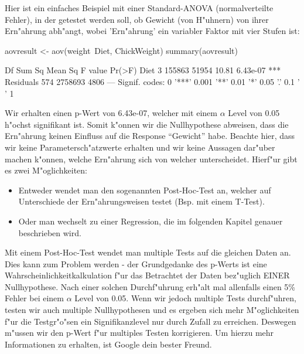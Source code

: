 \documentclass[a4paper,twoside]{tufte-book}\usepackage[]{graphicx}\usepackage[]{color}
\begin{document}
Hier ist ein einfaches Beispiel mit einer Standard-ANOVA (normalverteilte Fehler), in der getestet werden soll, ob Gewicht (von H"uhnern) von ihrer Ern"ahrung abh"angt, wobei 'Ern"ahrung' ein variabler Faktor mit vier Stufen ist:

\begin{Schunk}
\begin{Sinput}
aovresult <- aov(weight~Diet, ChickWeight)
summary(aovresult)
\end{Sinput}
\begin{Soutput}
             Df  Sum Sq Mean Sq F value   Pr(>F)    
Diet          3  155863   51954   10.81 6.43e-07 ***
Residuals   574 2758693    4806                     
---
Signif. codes:  0 '***' 0.001 '**' 0.01 '*' 0.05 '.' 0.1 ' ' 1
\end{Soutput}
\end{Schunk}

Wir erhalten einen p-Wert von 6.43e-07, welcher mit einem $\alpha$ Level von 0.05 h"ochst signifikant ist. Somit k"onnen wir die Nullhypothese abweisen, dass die Ern"ahrung keinen Einfluss auf die Response "`Gewicht"' habe. Beachte hier, dass wir keine Parametersch"atzwerte erhalten und wir keine Aussagen dar"uber machen k"onnen, welche Ern"ahrung sich von welcher unterscheidet. Hierf"ur gibt es zwei M"oglichkeiten:

\begin{itemize}
\item Entweder wendet man den sogenannten Post-Hoc-Test an, welcher auf Unterschiede der Ern"ahrungsweisen testet (Bsp. mit einem T-Test).
\item Oder man wechselt zu einer Regression, die im folgenden Kapitel genauer beschrieben wird.
\end{itemize}

Mit einem Post-Hoc-Test wendet man multiple Tests auf die gleichen Daten an. Dies kann zum Problem werden - der Grundgedanke des p-Werts ist eine Wahrscheinlichkeitkalkulation f"ur das Betrachtet der Daten bez"uglich EINER Nullhypothese. Nach einer solchen Durchf"uhrung erh"alt mal allenfalls einen  5\% Fehler bei einem $\alpha$ Level von 0.05.  Wenn wir jedoch multiple Tests durchf"uhren, testen wir auch multiple Nullhypothesen und es ergeben sich mehr M"oglichkeiten f"ur die Testgr"o"sen ein Signifikanzlevel nur durch Zufall zu erreichen. Deswegen m"ussen wir den p-Wert f"ur multiples Testen korrigieren. Um hierzu mehr Informationen zu erhalten, ist Google dein bester Freund. 
\end{document}
